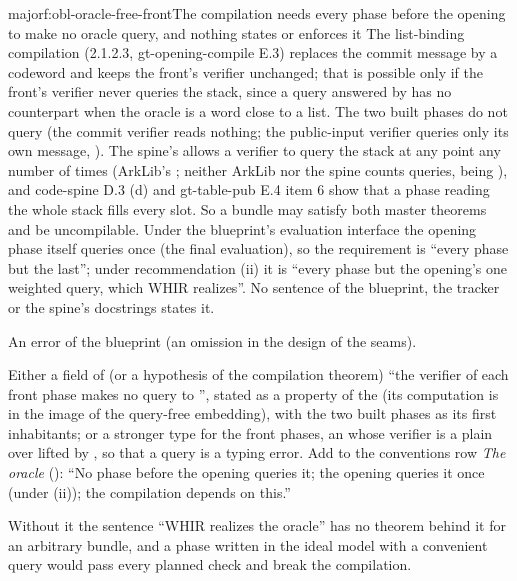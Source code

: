 \begin{finding}{major}{f:obl-oracle-free-front}{The compilation needs every phase before the opening to make no oracle query, and nothing states or enforces it}
 The list-binding compilation (2.1.2.3, gt-opening-compile E.3) replaces the commit message by a codeword and keeps the front's verifier unchanged; that is possible only if the front's verifier never queries the stack, since a query answered by  has no counterpart when the oracle is a word close to a list. The two built phases do not query (the commit verifier reads nothing; the public-input verifier queries only its own message, ). The spine's  allows a verifier to query the stack at any point any number of times (ArkLib's ; neither ArkLib nor the spine counts queries,  being ), and code-spine D.3 (d) and gt-table-pub E.4 item 6 show that a phase reading the whole stack fills every slot. So a bundle  may satisfy both master theorems and be uncompilable. Under the blueprint's evaluation interface the opening phase itself queries once (the final evaluation), so the requirement is ``every phase but the last''; under recommendation (ii) it is ``every phase but the opening's one weighted query, which WHIR realizes''. No sentence of the blueprint, the tracker or the spine's docstrings states it.

 An error of the blueprint (an omission in the design of the seams).

 Either a field of  (or a hypothesis of the compilation theorem) ``the verifier of each front phase makes no query to '', stated as a property of the  (its  computation is in the image of the query-free embedding), with the two built phases as its first inhabitants; or a stronger type for the front phases, an  whose verifier is a plain  over  lifted by , so that a query is a typing error. Add to the conventions row \emph{The oracle} (): ``No phase before the opening queries it; the opening queries it once (under (ii)); the compilation depends on this.''

 Without it the sentence ``WHIR realizes the oracle'' has no theorem behind it for an arbitrary bundle, and a phase written in the ideal model with a convenient query would pass every planned check and break the compilation.

\end{finding}

